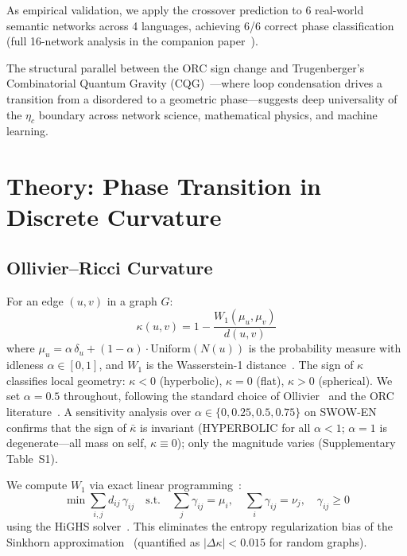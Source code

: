\documentclass[11pt,a4paper]{article}
\newcommand{\kbar}{\bar{\kappa}}
\newcommand{\etac}{\eta_c}
\begin{document}
As empirical validation, we apply the crossover prediction to 6 real-world semantic networks across 4 languages, achieving 6/6 correct phase classification (full 16-network analysis in the companion paper~\cite{paper2}).

The structural parallel between the ORC sign change and Trugenberger's Combinatorial Quantum Gravity (CQG)~\cite{trugenberger2017combinatorial,trugenberger2025review}---where loop condensation drives a transition from a disordered to a geometric phase---suggests deep universality of the $\etac$ boundary across network science, mathematical physics, and machine learning.


\section{Theory: Phase Transition in Discrete Curvature}
\label{sec:theory}

\subsection{Ollivier--Ricci Curvature}

For an edge $(u,v)$ in a graph $G$:
\begin{equation}
    \kappa(u,v) = 1 - \frac{W_1(\mu_u, \mu_v)}{d(u,v)}
    \label{eq:orc}
\end{equation}
where $\mu_u = \alpha\,\delta_u + (1-\alpha) \cdot \mathrm{Uniform}(N(u))$ is the probability measure with idleness $\alpha \in [0,1]$, and $W_1$ is the Wasserstein-1 distance~\cite{ollivier2009ricci}. The sign of $\kappa$ classifies local geometry: $\kappa < 0$ (hyperbolic), $\kappa = 0$ (flat), $\kappa > 0$ (spherical). We set $\alpha = 0.5$ throughout, following the standard choice of Ollivier~\cite{ollivier2009ricci} and the ORC literature~\cite{lin2011ricci,jost2014ollivier}. A sensitivity analysis over $\alpha \in \{0, 0.25, 0.5, 0.75\}$ on SWOW-EN confirms that the sign of $\kbar$ is invariant (HYPERBOLIC for all $\alpha < 1$; $\alpha=1$ is degenerate---all mass on self, $\kappa \equiv 0$); only the magnitude varies (Supplementary Table~S1).

We compute $W_1$ via exact linear programming~\cite{dunning2017jump}:
\begin{equation}
    \min \sum_{i,j} d_{ij}\,\gamma_{ij} \quad \text{s.t.} \quad \sum_j \gamma_{ij} = \mu_i,\quad \sum_i \gamma_{ij} = \nu_j,\quad \gamma_{ij} \geq 0
    \label{eq:lp}
\end{equation}
using the HiGHS solver~\cite{huber2024highs}. This eliminates the entropy regularization bias of the Sinkhorn approximation~\cite{cuturi2013sinkhorn} (quantified as $|\Delta\kappa| < 0.015$ for random graphs).
\end{document}
